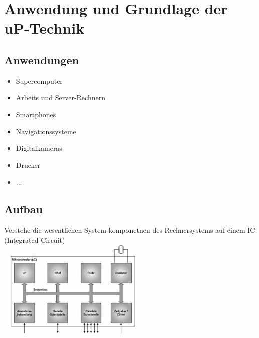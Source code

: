 \section{Anwendung und Grundlage der uP-Technik}
\begin{multicols}{2}
\subsection{Anwendungen}
\begin{minipage}{5cm}
\begin{itemize}
    \item Supercomputer
    \item Arbeits und Server-Rechnern
    \item Smartphones
    \item Navigationssysteme
    \item Digitalkameras
    \item Drucker
    \item ...
\end{itemize}
\end{minipage}

\subsection{Aufbau}

Verstehe die wesentlichen System-komponetnen des Rechnersystems auf einem IC (Integrated Circuit)\\	
\includegraphics[width=7cm]{images/aufbauuC}

\end{multicols}

